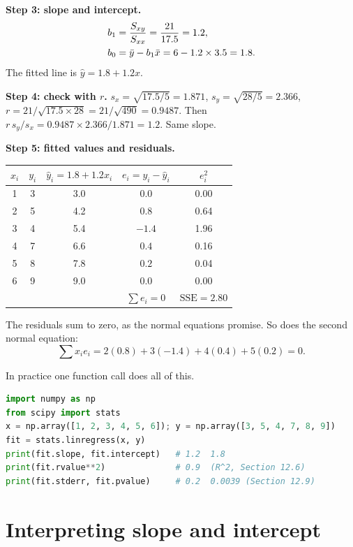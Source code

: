 \begin{walkbox}
\textbf{Step 3: slope and intercept.}
\begin{align*}
  b_1 &= \frac{S_{xy}}{S_{xx}} = \frac{21}{17.5} = 1.2, \\
  b_0 &= \bar{y} - b_1\bar{x} = 6 - 1.2\times 3.5 = 1.8 .
\end{align*}
The fitted line is $\hat y = 1.8 + 1.2x$.

\textbf{Step 4: check with $r$.} $s_x = \sqrt{17.5/5} = 1.871$,
$s_y=\sqrt{28/5} = 2.366$, $r = 21/\sqrt{17.5\times 28} = 21/\sqrt{490} = 0.9487$.
Then $r\,s_y/s_x = 0.9487\times 2.366/1.871 = 1.2$. Same slope.

\textbf{Step 5: fitted values and residuals.}

\begin{center}
\begin{tabular}{ccccc}
\toprule
$x_i$ & $y_i$ & $\hat y_i = 1.8+1.2x_i$ & $e_i = y_i-\hat y_i$ & $e_i^2$ \\
\midrule
1 & 3 & 3.0 & $0.0$ & 0.00 \\
2 & 5 & 4.2 & $0.8$ & 0.64 \\
3 & 4 & 5.4 & $-1.4$ & 1.96 \\
4 & 7 & 6.6 & $0.4$ & 0.16 \\
5 & 8 & 7.8 & $0.2$ & 0.04 \\
6 & 9 & 9.0 & $0.0$ & 0.00 \\
\midrule
 & & & $\sum e_i = 0$ & $\mathrm{SSE}=2.80$ \\
\bottomrule
\end{tabular}
\end{center}
The residuals sum to zero, as the normal equations promise. So does the
second normal equation:
\[
  \textstyle\sum x_ie_i = 2(0.8) + 3(-1.4) + 4(0.4) + 5(0.2) = 0 .
\]
\end{walkbox}

In practice one function call does all of this.

\begin{lstlisting}[language=Python]
import numpy as np
from scipy import stats
x = np.array([1, 2, 3, 4, 5, 6]); y = np.array([3, 5, 4, 7, 8, 9])
fit = stats.linregress(x, y)
print(fit.slope, fit.intercept)   # 1.2  1.8
print(fit.rvalue**2)              # 0.9  (R^2, Section 12.6)
print(fit.stderr, fit.pvalue)     # 0.2  0.0039 (Section 12.9)
\end{lstlisting}

\section{Interpreting slope and intercept}
\label{sec:slr-interpret}

